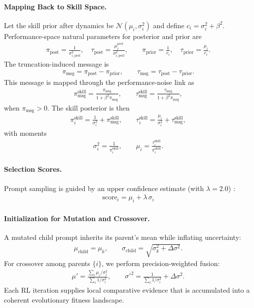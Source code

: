 \documentclass{article}
\theoremstyle{plain}
\theoremstyle{definition}
\theoremstyle{remark}
\begin{document}
\paragraph{Mapping Back to Skill Space.}
Let the skill prior after dynamics be $\mathcal{N}(\mu_i,\sigma_i^2)$ and define $c_i=\sigma_i^2+\beta^2$. Performance-space natural parameters for posterior and prior are
\begin{align*}
\pi_{\text{post}}=\frac{1}{\sigma_{i,\text{perf}}^2}, \quad
\tau_{\text{post}}=\frac{\mu_i^{\text{perf}}}{\sigma_{i,\text{perf}}^2}, \qquad
\pi_{\text{prior}}=\frac{1}{c_i}, \quad
\tau_{\text{prior}}=\frac{\mu_i}{c_i}.
\end{align*}
The truncation-induced message is
\begin{align*}
\pi_{\text{msg}}=\pi_{\text{post}}-\pi_{\text{prior}}, \qquad
\tau_{\text{msg}}=\tau_{\text{post}}-\tau_{\text{prior}} .
\end{align*}
This message is mapped through the performance-noise link as
\begin{align*}
\pi_{\text{msg}}^{\text{skill}}=\frac{\pi_{\text{msg}}}{1+\beta^2\pi_{\text{msg}}}, \qquad
\tau_{\text{msg}}^{\text{skill}}=\frac{\tau_{\text{msg}}}{1+\beta^2\pi_{\text{msg}}},
\end{align*}
when $\pi_{\text{msg}}>0$. The skill posterior is then
\begin{align*}
\pi_i^{\text{skill}}=\frac{1}{\sigma_i^2}+\pi_{\text{msg}}^{\text{skill}}, \qquad
\tau_i^{\text{skill}}=\frac{\mu_i}{\sigma_i^2}+\tau_{\text{msg}}^{\text{skill}},
\end{align*}
with moments
\begin{align*}
\sigma_i^{2}=\frac{1}{\pi_i^{\text{skill}}}, \qquad
\mu_i=\frac{\tau_i^{\text{skill}}}{\pi_i^{\text{skill}}}.
\end{align*}

\paragraph{Selection Scores.}
Prompt sampling is guided by an upper confidence estimate (with $\lambda=2.0$) \cite{srinivas2009gaussian, kaufmann2012bayesian, lucb, zhu2024ucb}:
\begin{align*}
\text{score}_i=\mu_i+\lambda \, \sigma_i
\end{align*}
\paragraph{Initialization for Mutation and Crossover.}
A mutated child prompt inherits its parent’s mean while inflating uncertainty:
\begin{align*}
\mu_{\text{child}}=\mu_k, \qquad
\sigma_{\text{child}}=\sqrt{\sigma_k^2+\Delta\sigma^2}.
\end{align*}
For crossover among parents $\{i\}$, we perform precision-weighted fusion:
\begin{align*}
\mu'=\frac{\sum_i \mu_i/\sigma_i^2}{\sum_i 1/\sigma_i^2}, \qquad
\sigma'^2=\frac{1}{\sum_i 1/\sigma_i^2}+\Delta\sigma^2 .
\end{align*}
Each RL iteration supplies local comparative evidence that is accumulated into a coherent evolutionary fitness landscape.
\end{document}
